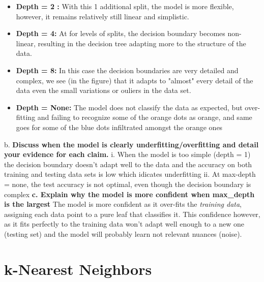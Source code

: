 \documentclass[acmconf,nonacm=true]{acmart}
\begin{document}
    \begin{itemize}
        \item \textbf{Depth = 2 :}  With this 1 additional split, the model is more flexible, however, it remains relatively still linear and simplistic.
    \end{itemize}
   \begin{itemize}
       \item \textbf{ Depth = 4: }At for levels of splits, the decision boundary becomes non-linear, resulting in the decision tree adapting more to the structure of the data.
   \end{itemize}
   \begin{itemize}
       \item \textbf{Depth = 8: } In this case the decision boundaries are very detailed and complex, we see (in the figure) that it adapts to "almost" every detail of the data even the small variations or ouliers in the data set.
       \item \textbf{Depth = None: } The model does not classify the data as expected, but over-fitting and failing to recognize some of the orange dots as orange, and same goes for some of the blue dots infiltrated amongst the orange ones
    \end{itemize}
b.  \textbf{Discuss when the model is clearly underfitting/overfitting and detail your evidence for each claim.}
    i. When the model is too simple (depth = 1) the decision boundary doesn't adapt well to the data and the accuracy on both training and testing data sets is low which idicates underfitting
    ii. At max-depth = none, the test accuracy is not optimal, even though the decision boundary is complex
    \textbf{c. Explain why the model is more confident when max\_depth is the largest} 
    The model is more confident as it over-fits the \textit{training data}, assigning each data point to a pure leaf that classifies it. This confidence however, as it fits perfectly to the training data won't adapt well enough to a new one (testing set) and the model will probably learn not relevant nuances (noise).  

\section{k-Nearest Neighbors}
\end{document}

